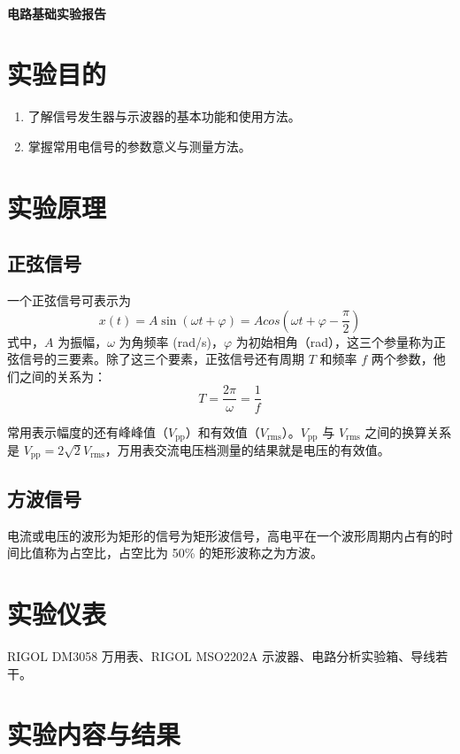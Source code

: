 \documentclass[a4paper,utf8]{article}
\begin{document}
\begin{center}
    {\mbox{}\\[7em]\bfseries\songti%
    电路基础实验报告}\\[34mm]
\end{center}
\newpage
\section{实验目的}
\begin{enumerate}
    \item 了解信号发生器与示波器的基本功能和使用方法。
    \item 掌握常用电信号的参数意义与测量方法。
\end{enumerate}

\section{实验原理}%
\subsection{正弦信号}
一个正弦信号可表示为 $$x(t) = A\sin(\omega t+\varphi)=Acos(\omega t+\varphi-\dfrac{\pi}{2})$$ 
式中，$A$ 为振幅，$\omega$ 为角频率 (\unit{\radian/\s})，$\varphi$ 为初始相角（\unit{\radian}），这三个参量称为正弦信号的三要素。除了这三个要素，正弦信号还有周期 $T$ 和频率 $f$ 两个参数，他们之间的关系为：$$ T=\dfrac{2\pi}{\omega}=\dfrac{1}{f} $$\par
常用表示幅度的还有峰峰值（$V_\text{pp}$）和有效值（$V_\text{rms}$）。$V_\text{pp}$ 与 $V_\text{rms}$ 之间的换算关系是 $V_\text{pp}=2\sqrt{2} V_\text{rms}$，万用表交流电压档测量的结果就是电压的有效值。
\subsection{方波信号}
电流或电压的波形为矩形的信号为矩形波信号，高电平在一个波形周期内占有的时间比值称为占空比，占空比为 50\% 的矩形波称之为方波。

\section{实验仪表}
    RIGOL DM3058 万用表、RIGOL MSO2202A 示波器、电路分析实验箱、导线若干。
    \section{实验内容与结果}
\end{document}

